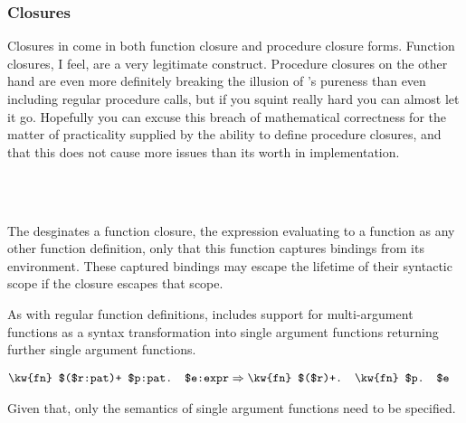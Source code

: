 \subsubsection{Closures}

Closures in \Trilogy{} come in both function closure and procedure closure forms.
Function closures, I feel, are a very legitimate construct. Procedure closures
on the other hand are even more definitely breaking the illusion of \Poetry{}'s
pureness than even including regular procedure calls, but if you squint really
hard you can almost let it go. Hopefully you can excuse this breach of mathematical
correctness for the matter of practicality supplied by the ability to define
procedure closures, and that this does not cause more issues than its worth
in implementation.

\begin{bnf*}
     \\
     \\
\end{bnf*}

The  desginates a function closure, the  expression evaluating
to a function as any other function definition, only that this function
captures bindings from its environment. These captured bindings may escape
the lifetime of their syntactic scope if the closure escapes that scope.

As with regular function definitions,  includes support for
multi-argument functions as a syntax transformation into single argument
functions returning further single argument functions.

\begin{align*}
    \texttt{\kw{fn} \$(\$r:pat)+ \$p:pat. \$e:expr} & \Rightarrow \texttt{\kw{fn} \$(\$r)+. \kw{fn} \$p. \$e} %
\end{align*}

Given that, only the semantics of single argument functions need to be specified.

